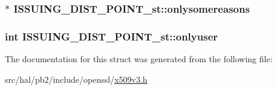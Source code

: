 \subsubsection[{\texorpdfstring{onlysomereasons}{onlysomereasons}}]{$\ast$ I\+S\+S\+U\+I\+N\+G\+\_\+\+D\+I\+S\+T\+\_\+\+P\+O\+I\+N\+T\+\_\+st\+::onlysomereasons}\hypertarget{struct_i_s_s_u_i_n_g___d_i_s_t___p_o_i_n_t__st_a87b14dba5e51a2c4cdae476453725cec}{}\label{struct_i_s_s_u_i_n_g___d_i_s_t___p_o_i_n_t__st_a87b14dba5e51a2c4cdae476453725cec}
\subsubsection[{\texorpdfstring{onlyuser}{onlyuser}}]{\setlength{\rightskip}{0pt plus 5cm}int I\+S\+S\+U\+I\+N\+G\+\_\+\+D\+I\+S\+T\+\_\+\+P\+O\+I\+N\+T\+\_\+st\+::onlyuser}\hypertarget{struct_i_s_s_u_i_n_g___d_i_s_t___p_o_i_n_t__st_ad0d25508c76cac7e0d7f4bb0ac1d64d3}{}\label{struct_i_s_s_u_i_n_g___d_i_s_t___p_o_i_n_t__st_ad0d25508c76cac7e0d7f4bb0ac1d64d3}


The documentation for this struct was generated from the following file\+:\begin{DoxyCompactItemize}
\item 
src/hal/pb2/include/openssl/\hyperlink{x509v3_8h}{x509v3.\+h}\end{DoxyCompactItemize}
